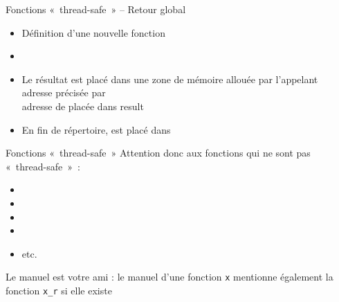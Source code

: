 \begin {frame} {Fonctions «~thread-safe~» -- Retour global}

    \begin {itemize}
	\item Définition d'une nouvelle fonction

	\item {}

	\item Le résultat est placé dans une zone de mémoire allouée
	    par l'appelant \\
	    \implique adresse précisée par  \\
	    \implique adresse de  placée dans \code
	    {result}

	\item En fin de répertoire,  est placé dans

    \end {itemize}

\end {frame}

\begin {frame} {Fonctions «~thread-safe~»}
    Attention donc aux fonctions qui ne sont pas «~thread-safe~»~:

    \begin {itemize}
	\item {} \implique {}
	\item {} \implique {}
	\item {} \implique {}
	\item {} \implique {}
	\item etc.
    \end {itemize}

    \vspace* {3mm}

    Le manuel est votre ami : le manuel d'une fonction \texttt {x}
    mentionne également la fonction \texttt {x\_r} si elle existe

\end {frame}

